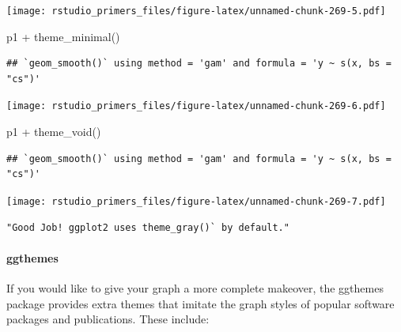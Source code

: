 \documentclass[
]{article}
\newenvironment{Shaded}{\begin{snugshade}}{\end{snugshade}}
\newcommand{\FunctionTok}[1]{\textcolor[rgb]{0.00,0.00,0.00}{#1}}
\newcommand{\NormalTok}[1]{#1}
\newcommand{\SpecialCharTok}[1]{\textcolor[rgb]{0.00,0.00,0.00}{#1}}
\begin{document}
\texttt{[image: rstudio\_primers\_files/figure-latex/unnamed-chunk-269-5.pdf]}

\begin{Shaded}
\begin{Highlighting}[]
\NormalTok{p1 }\SpecialCharTok{+} \FunctionTok{theme\_minimal}\NormalTok{()}
\end{Highlighting}
\end{Shaded}

\begin{verbatim}
## `geom_smooth()` using method = 'gam' and formula = 'y ~ s(x, bs = "cs")'
\end{verbatim}

\texttt{[image: rstudio\_primers\_files/figure-latex/unnamed-chunk-269-6.pdf]}

\begin{Shaded}
\begin{Highlighting}[]
\NormalTok{p1 }\SpecialCharTok{+} \FunctionTok{theme\_void}\NormalTok{()}
\end{Highlighting}
\end{Shaded}

\begin{verbatim}
## `geom_smooth()` using method = 'gam' and formula = 'y ~ s(x, bs = "cs")'
\end{verbatim}

\texttt{[image: rstudio\_primers\_files/figure-latex/unnamed-chunk-269-7.pdf]}

\begin{verbatim}
"Good Job! ggplot2 uses theme_gray()` by default."
\end{verbatim}

\hypertarget{ggthemes}{%
\paragraph{ggthemes}\label{ggthemes}}

If you would like to give your graph a more complete makeover, the
ggthemes package provides extra themes that imitate the graph styles of
popular software packages and publications. These include:
\end{document}
